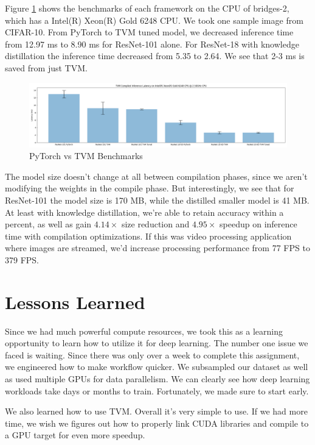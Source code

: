 \documentclass{article}
\begin{document}
Figure \ref{fig:tvm-benchmarks} shows the benchmarks of each framework on the CPU of bridges-2, which has a Intel(R) Xeon(R) Gold 6248 CPU. We took one sample image from CIFAR-10. From PyTorch to TVM tuned model, we decreased inference time from 12.97 ms to 8.90 ms for ResNet-101 alone. For ResNet-18 with knowledge distillation the inference time decreased from 5.35 to 2.64. We see that 2-3 ms is saved from just TVM. 

\begin{figure}
    \centerline{\includegraphics[width=7in]{../proj4/figures/tvm_benchmarks.png}}
    \caption{PyTorch vs TVM Benchmarks}
    \label{fig:tvm-benchmarks}
\end{figure}

The model size doesn't change at all between compilation phases, since we aren't modifying the weights in the compile phase. But interestingly, we see that for ResNet-101 the model size is 170 MB, while the distilled smaller model is 41 MB. At least with knowledge distillation, we're able to retain accuracy within a percent, as well as gain $4.14\times$ size reduction and $4.95\times$ speedup on inference time with compilation optimizations. If this was video processing application where images are streamed, we'd increase processing performance from 77 FPS to 379 FPS.

\section{Lessons Learned}
Since we had much powerful compute resources, we took this as a learning opportunity to learn how to utilize it for deep learning. The number one issue we faced is waiting. Since there was only over a week to complete this assignment, we engineered how to make workflow quicker. We subsampled our dataset as well as used multiple GPUs for data parallelism. We can clearly see how deep learning workloads take days or months to train. Fortunately, we made sure to start early.

We also learned how to use TVM. Overall it's very simple to use. If we had more time, we wish we figures out how to properly link CUDA libraries and compile to a GPU target for even more speedup.
\end{document}
